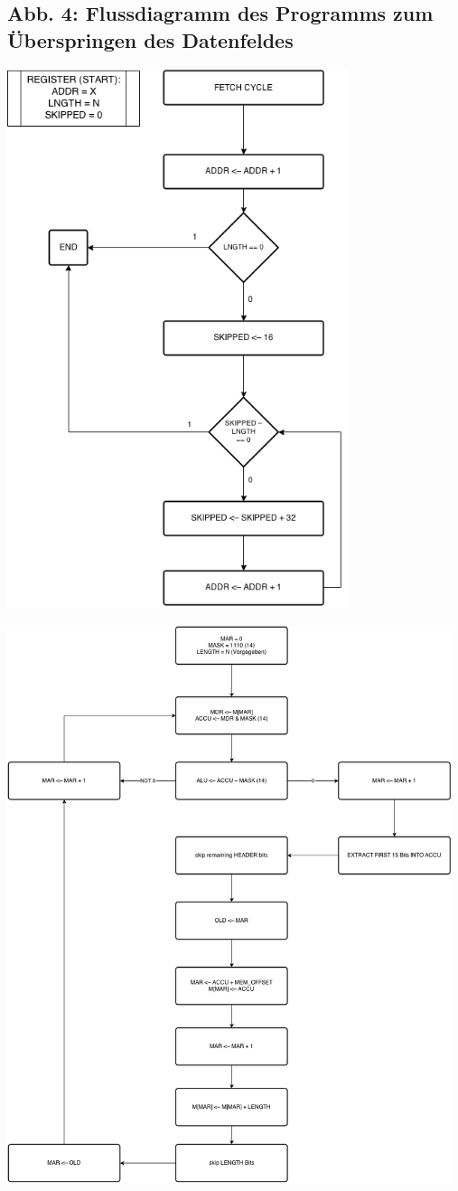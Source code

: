 \documentclass[12pt,titlepage]{article}
\begin{document}
\subsection{Abb. 4: Flussdiagramm des Programms zum Überspringen des Datenfeldes}
\includegraphics[width=10cm]{skipBits.png}

\includegraphics[width=13cm]{algo_flow.png}
\end{document}
